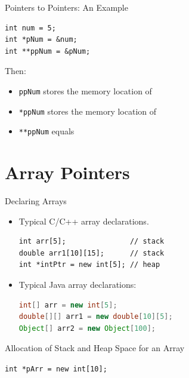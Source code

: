 \documentclass[14pt,aspectratio=1610]{beamer}
\begin{document}
\begin{frame}[fragile]{Pointers to Pointers: An Example}

\begin{lstlisting}
int num = 5;
int *pNum = &num;
int **ppNum = &pNum;
\end{lstlisting}

Then:
\begin{itemize}
\item
  \lstinline{ppNum} stores the memory location of
\item<3->
  \lstinline{*ppNum} stores the memory location of
\item<5->
  \lstinline{**ppNum} equals
\end{itemize}
\end{frame}

\section{Array Pointers}

\begin{frame}[fragile]{Declaring Arrays}

\begin{itemize}
\item
  Typical C/C++ array declarations.
  \begin{lstlisting}
int arr[5];               // stack
double arr1[10][15];      // stack
int *intPtr = new int[5]; // heap
\end{lstlisting}
\item
  Typical Java array declarations:
  \begin{lstlisting}[language=Java]
int[] arr = new int[5];
double[][] arr1 = new double[10][5];
Object[] arr2 = new Object[100];
\end{lstlisting}
\end{itemize}
\end{frame}

\begin{frame}{Allocation of Stack and Heap Space for an Array}
\begin{center}
\lstinline{int *pArr = new int[10];}\\\vspace{1em}


\end{center}
\end{frame}
\end{document}

